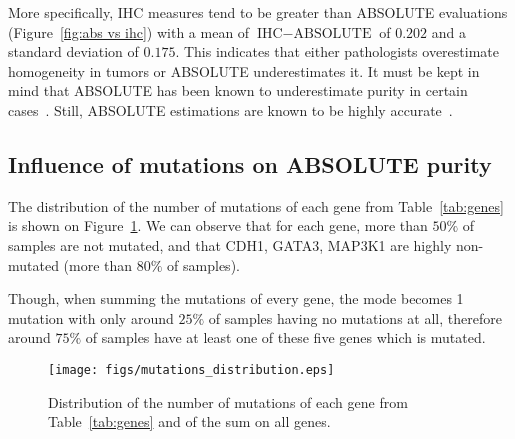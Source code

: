 \documentclass[letterpaper]{article}
\begin{document}
More specifically, IHC measures tend to be greater than ABSOLUTE evaluations (Figure~\ref{fig:abs vs ihc}) with a mean of $\text{IHC} - \text{ABSOLUTE}$ of $0.202$
and a standard deviation of $0.175$. This indicates that either pathologists overestimate homogeneity in tumors or ABSOLUTE underestimates it. It must be kept in
mind that ABSOLUTE has been known to underestimate purity in certain cases~\citep{oesper2014quantifying}. Still, ABSOLUTE estimations are known to be highly
accurate~\citep{carter2012absolute}.

\subsection{Influence of mutations on ABSOLUTE purity}
The distribution of the number of mutations of each gene from Table~\ref{tab:genes} is shown on Figure~\ref{fig:mutations distribution}. We can observe that for each
gene, more than $50\%$ of samples are not mutated, and that CDH1, GATA3, MAP3K1 are highly non-mutated (more than $80\%$ of samples).

Though, when summing the mutations of every gene, the mode becomes 1 mutation with only around $25\%$ of samples having no mutations at all, therefore around $75\%$
of samples have at least one of these five genes which is mutated.

\begin{figure}[!h]
\hspace{-.5cm}
{\texttt{[image: figs/mutations\_distribution.eps]}
\vspace{-1cm}
\caption{Distribution of the number of mutations of each gene from Table~\ref{tab:genes} and of the sum on all genes.\label{fig:mutations distribution}}}
\end{figure}
\end{document}
